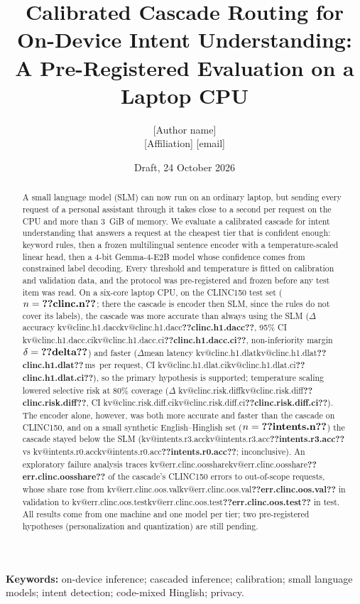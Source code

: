\documentclass[11pt,a4paper]{article}
\title{Calibrated Cascade Routing for On-Device Intent Understanding:\\
A Pre-Registered Evaluation on a Laptop CPU}
\author{[Author name]\\[2pt] \small [Affiliation] \quad \small [email]}
\date{Draft, 24 October 2026}
\makeatletter
\DeclareRobustCommand{\kv}[1]{\ifcsname kv@#1\endcsname\csname kv@#1\endcsname\else\textbf{??#1??}\fi}
\newcommand{\ms}{\,ms}
\makeatother
\begin{document}
\maketitle

\begin{abstract}
A small language model (SLM) can now run on an ordinary laptop, but sending every request of a personal assistant
through it takes close to a second per request on the CPU and more than 3~GiB of memory. We evaluate a calibrated cascade for
intent understanding that answers a request at the cheapest tier that is confident enough: keyword rules, then a frozen
multilingual sentence encoder with a temperature-scaled linear head, then a 4-bit Gemma-4-E2B model whose confidence
comes from constrained label decoding. Every threshold and temperature is fitted on calibration and validation data, and
the protocol was pre-registered and frozen before any test item was read. On a six-core laptop CPU, on the CLINC150 test
set ($n=\kv{clinc.n}$; there the cascade is encoder then SLM, since the rules do not cover its labels), the cascade was
more accurate than always using the SLM ($\Delta$accuracy \kv{clinc.h1.dacc},
95\% CI \kv{clinc.h1.dacc.ci}, non-inferiority margin $\delta=\kv{delta}$) and faster ($\Delta$mean latency
\kv{clinc.h1.dlat}\ms\ per request, CI \kv{clinc.h1.dlat.ci}), so the primary hypothesis is supported; temperature scaling lowered selective
risk at 80\% coverage ($\Delta$ \kv{clinc.risk.diff}, CI \kv{clinc.risk.diff.ci}). The encoder alone, however, was both more
accurate and faster than the cascade on CLINC150, and on a small synthetic English--Hinglish set ($n=\kv{intents.n}$)
the cascade stayed below the SLM (\kv{intents.r3.acc} vs \kv{intents.r0.acc}; inconclusive). An exploratory failure
analysis traces \kv{err.clinc.oosshare} of the cascade's CLINC150 errors to out-of-scope requests, whose share rose
from \kv{err.clinc.oos.val} in validation to \kv{err.clinc.oos.test} in test. All results come from one machine and one
model per tier; two pre-registered hypotheses (personalization and quantization) are still pending.
\end{abstract}

\noindent\textbf{Keywords:} on-device inference; cascaded inference; calibration; small language models;
intent detection; code-mixed Hinglish; privacy.

\end{document}
